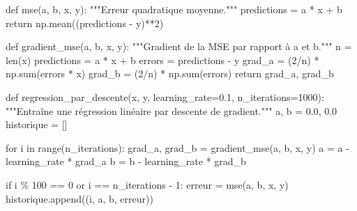 \documentclass[
  french,
  11pt,
  a4paper,
]{scrbook}
\newenvironment{Shaded}{}{}
\newcommand{\BuiltInTok}[1]{\textcolor[rgb]{0.84,0.23,0.29}{#1}}
\newcommand{\CommentTok}[1]{\textcolor[rgb]{0.42,0.45,0.49}{#1}}
\newcommand{\ControlFlowTok}[1]{\textcolor[rgb]{0.84,0.23,0.29}{#1}}
\newcommand{\DecValTok}[1]{\textcolor[rgb]{0.00,0.36,0.77}{#1}}
\newcommand{\FloatTok}[1]{\textcolor[rgb]{0.00,0.36,0.77}{#1}}
\newcommand{\KeywordTok}[1]{\textcolor[rgb]{0.84,0.23,0.29}{#1}}
\newcommand{\NormalTok}[1]{\textcolor[rgb]{0.14,0.16,0.18}{#1}}
\newcommand{\OperatorTok}[1]{\textcolor[rgb]{0.14,0.16,0.18}{#1}}
\begin{document}
\begin{Shaded}
\begin{Highlighting}[]
\KeywordTok{def}\NormalTok{ mse(a, b, x, y):}
    \CommentTok{"""Erreur quadratique moyenne."""}
\NormalTok{    predictions }\OperatorTok{=}\NormalTok{ a }\OperatorTok{*}\NormalTok{ x }\OperatorTok{+}\NormalTok{ b}
    \ControlFlowTok{return}\NormalTok{ np.mean((predictions }\OperatorTok{{-}}\NormalTok{ y)}\OperatorTok{**}\DecValTok{2}\NormalTok{)}

\KeywordTok{def}\NormalTok{ gradient\_mse(a, b, x, y):}
    \CommentTok{"""Gradient de la MSE par rapport à a et b."""}
\NormalTok{    n }\OperatorTok{=} \BuiltInTok{len}\NormalTok{(x)}
\NormalTok{    predictions }\OperatorTok{=}\NormalTok{ a }\OperatorTok{*}\NormalTok{ x }\OperatorTok{+}\NormalTok{ b}
\NormalTok{    errors }\OperatorTok{=}\NormalTok{ predictions }\OperatorTok{{-}}\NormalTok{ y}
\NormalTok{    grad\_a }\OperatorTok{=}\NormalTok{ (}\DecValTok{2}\OperatorTok{/}\NormalTok{n) }\OperatorTok{*}\NormalTok{ np.}\BuiltInTok{sum}\NormalTok{(errors }\OperatorTok{*}\NormalTok{ x)}
\NormalTok{    grad\_b }\OperatorTok{=}\NormalTok{ (}\DecValTok{2}\OperatorTok{/}\NormalTok{n) }\OperatorTok{*}\NormalTok{ np.}\BuiltInTok{sum}\NormalTok{(errors)}
    \ControlFlowTok{return}\NormalTok{ grad\_a, grad\_b}

\KeywordTok{def}\NormalTok{ regression\_par\_descente(x, y, learning\_rate}\OperatorTok{=}\FloatTok{0.1}\NormalTok{, n\_iterations}\OperatorTok{=}\DecValTok{1000}\NormalTok{):}
    \CommentTok{"""Entraîne une régression linéaire par descente de gradient."""}
\NormalTok{    a, b }\OperatorTok{=} \FloatTok{0.0}\NormalTok{, }\FloatTok{0.0}
\NormalTok{    historique }\OperatorTok{=}\NormalTok{ []}
    
    \ControlFlowTok{for}\NormalTok{ i }\KeywordTok{in} \BuiltInTok{range}\NormalTok{(n\_iterations):}
\NormalTok{        grad\_a, grad\_b }\OperatorTok{=}\NormalTok{ gradient\_mse(a, b, x, y)}
\NormalTok{        a }\OperatorTok{=}\NormalTok{ a }\OperatorTok{{-}}\NormalTok{ learning\_rate }\OperatorTok{*}\NormalTok{ grad\_a}
\NormalTok{        b }\OperatorTok{=}\NormalTok{ b }\OperatorTok{{-}}\NormalTok{ learning\_rate }\OperatorTok{*}\NormalTok{ grad\_b}
        
        \ControlFlowTok{if}\NormalTok{ i }\OperatorTok{\%} \DecValTok{100} \OperatorTok{==} \DecValTok{0} \KeywordTok{or}\NormalTok{ i }\OperatorTok{==}\NormalTok{ n\_iterations }\OperatorTok{{-}} \DecValTok{1}\NormalTok{:}
\NormalTok{            erreur }\OperatorTok{=}\NormalTok{ mse(a, b, x, y)}
\NormalTok{            historique.append((i, a, b, erreur))}
    

\end{Highlighting}
\end{Shaded}
\end{document}
